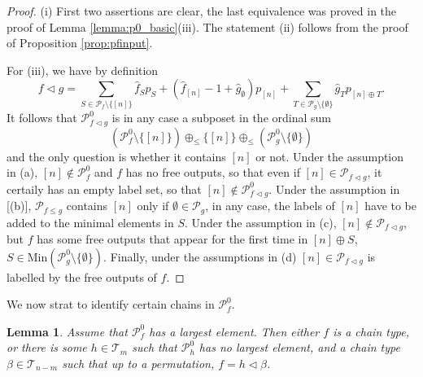 \documentclass[12pt]{article}
\newtheorem{lemma}{Lemma}
\theoremstyle{definition}
\theoremstyle{remark}
\def\Te{\mathcal T}
\def\Pe{\mathcal P}
\def\vtl{\vartriangleleft}
\begin{document}
\begin{proof} (i) First two assertions are clear, the last equivalence was proved in the
proof of Lemma \ref{lemma:p0_basic}(iii).
The statement (ii) follows from the proof of Proposition \ref{prop:pfinput}. 

For (iii), we have by definition
\[
f\vtl g=\sum_{S\in \Pe_f\setminus\{[n]\}} \hat f_Sp_S+ (\hat f_{[n]}-1 + \hat
g_\emptyset)p_{[n]}+\sum_{T\in \Pe_g\setminus \{\emptyset\}} \hat g_T p_{[n]\oplus T}.
\]
It follows that $\Pe^0_{f\vtl g}$ is in any case a subposet in the ordinal sum 
\[
(\Pe_f^0\setminus \{[n]\})\oplus_\le\{[n]\}\oplus_\le (\Pe_{g}^0\setminus\{\emptyset\})
\]
and the only question is whether it contains $[n]$ or not. 
Under the assumption in (a), $[n]\notin \Pe_f^0$ and $f$ has no free outputs, so that even
if $[n]\in \Pe_{f\vtl g}$, it certaily has an empty label set, so that $[n]\notin
\Pe_{f\vtl g}^0$. Under the assumption in [(b)], $\Pe_{f\le g}$ contains $[n]$ only if
$\emptyset\in \Pe_g$, in any case, the labels of $[n]$ have to be added to the minimal
elements in $S$. Under the assumption in (c), $[n]\notin \Pe_{f\vtl g}$, but $f$ has some
free outputs that appear for the first time in $[n]\oplus S$, $S\in
\mathrm{Min}(\Pe_g^0\setminus \{\emptyset\})$. Finally, under the assumptions in (d)
$[n]\in \Pe_{f\vtl g}$ is labelled by the free outputs of $f$.

\end{proof}

We now strat to identify certain chains in $\Pe_f^0$.

\begin{lemma}\label{lemma:pf0_largest} Assume that $\Pe_f^0$ has a largest element.  Then
either $f$ is a chain type, or there is some $h\in \Te_m$ such that $\Pe_h^0$ has  no largest element,
and a chain type $\beta\in \Te_{n-m}$ such that up to a permutation, $f=h\vtl \beta$.

\end{lemma}
\end{document}
